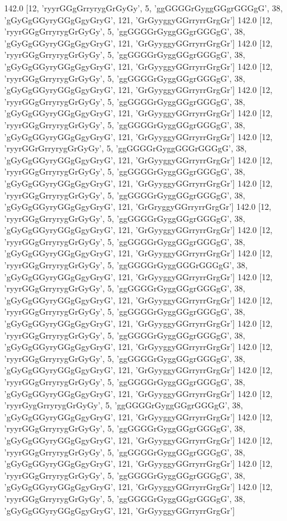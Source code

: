 142.0 [12, 'ryyrGGgGrryrygGrGyGy', 5, 'ggGGGGrGyggGGgrGGGgG', 38, 'gGyGgGGyryGGgGgyGryG', 121, 'GrGyyggyGGrryrrGrgGr']
142.0 [12, 'ryyrGGgGrryrygGrGyGy', 5, 'ggGGGGrGyggGGgrGGGgG', 38, 'gGyGgGGyryGGgGgyGryG', 121, 'GrGyyggyGGrryrrGrgGr']
142.0 [12, 'ryyrGGgGrryrygGrGyGy', 5, 'ggGGGGrGyggGGgrGGGgG', 38, 'gGyGgGGyryGGgGgyGryG', 121, 'GrGyyggyGGrryrrGrgGr']
142.0 [12, 'ryyrGGgGrryrygGrGyGy', 5, 'ggGGGGrGyggGGgrGGGgG', 38, 'gGyGgGGyryGGgGgyGryG', 121, 'GrGyyggyGGrryrrGrgGr']
142.0 [12, 'ryyrGGgGrryrygGrGyGy', 5, 'ggGGGGrGyggGGgrGGGgG', 38, 'gGyGgGGyryGGgGgyGryG', 121, 'GrGyyggyGGrryrrGrgGr']
142.0 [12, 'ryyrGGgGrryrygGrGyGy', 5, 'ggGGGGrGyggGGgrGGGgG', 38, 'gGyGgGGyryGGgGgyGryG', 121, 'GrGyyggyGGrryrrGrgGr']
142.0 [12, 'ryyrGGrGrryrygGrGyGy', 5, 'ggGGGGrGyggGGGrGGGgG', 38, 'gGyGgGGyryGGgGgyGryG', 121, 'GrGyyggyGGrryrrGrgGr']
142.0 [12, 'ryyrGGgGrryrygGrGyGy', 5, 'ggGGGGrGyggGGgrGGGgG', 38, 'gGyGgGGyryGGgGgyGryG', 121, 'GrGyyggyGGrryrrGrgGr']
142.0 [12, 'ryyrGGgGrryrygGrGyGy', 5, 'ggGGGGrGyggGGgrGGGgG', 38, 'gGyGgGGyryGGgGgyGryG', 121, 'GrGryggyGGrryrrGrgGr']
142.0 [12, 'ryyrGGgGrryrygGrGyGy', 5, 'ggGGGGrGyggGGgrGGGgG', 38, 'gGyGgGGyryGGgGgyGryG', 121, 'GrGyyggyGGrryrrGrgGr']
142.0 [12, 'ryyrGGgGrryrygGrGyGy', 5, 'ggGGGGrGyggGGgrGGGgG', 38, 'gGyGgGGyryGGgGgyGryG', 121, 'GrGyyggyGGrryrrGrgGr']
142.0 [12, 'ryyrGGgGrryrygGrGyGy', 5, 'ggGGGGrGyggGGGrGGGgG', 38, 'gGyGgGGyryGGgGgyGryG', 121, 'GrGyyggyGGrryrrGrgGr']
142.0 [12, 'ryyrGGgGrryrygGrGyGy', 5, 'ggGGGGrGyggGGgrGGGgG', 38, 'gGyGgGGyryGGgGgyGryG', 121, 'GrGyyggyGGrryrrGrgGr']
142.0 [12, 'ryyrGGgGrryrygGrGyGy', 5, 'ggGGGGrGyggGGgrGGGgG', 38, 'gGyGgGGyryGGgGgyGryG', 121, 'GrGyyggyGGrryrrGrgGr']
142.0 [12, 'ryyrGGgGrryrygGrGyGy', 5, 'ggGGGGrGyggGGgrGGGgG', 38, 'gGyGgGGyryGGgGgyGryG', 121, 'GrGyyggyGGrryrrGrgGr']
142.0 [12, 'ryyrGGgGrryrygGrGyGy', 5, 'ggGGGGrGyggGGgrGGGgG', 38, 'gGyGgGGyryGGgGgyGryG', 121, 'GrGyyggyGGrryrrGrgGr']
142.0 [12, 'ryyrGGgGrryrygGrGyGy', 5, 'ggGGGGrGyggGGgrGGGgG', 38, 'gGyGgGGyryGGgGgyGryG', 121, 'GrGyyggyGGrryrrGrgGr']
142.0 [12, 'ryyrGygGrryrygGrGyGy', 5, 'ggGGGGrGyggGGgrGGGgG', 38, 'gGyGgGGyryGGgGgyGryG', 121, 'GrGyyggyGGrryrrGrgGr']
142.0 [12, 'ryyrGGgGrryrygGrGyGy', 5, 'ggGGGGrGyggGGgrGGGgG', 38, 'gGyGgGGyryGGgGgyGryG', 121, 'GrGyyggyGGrryrrGrgGr']
142.0 [12, 'ryyrGGgGrryrygGrGyGy', 5, 'ggGGGGrGyggGGgrGGGgG', 38, 'gGyGgGGyryGGgGgyGryG', 121, 'GrGyyggyGGrryrrGrgGr']
142.0 [12, 'ryyrGGgGrryrygGrGyGy', 5, 'ggGGGGrGyggGGgrGGGgG', 38, 'gGyGgGGyryGGgGgyGryG', 121, 'GrGyyggyGGrryrrGrgGr']
142.0 [12, 'ryyrGGgGrryrygGrGyGy', 5, 'ggGGGGrGyggGGgrGGGgG', 38, 'gGyGgGGyryGGgGgyGryG', 121, 'GrGyyggyGGrryrrGrgGr']
